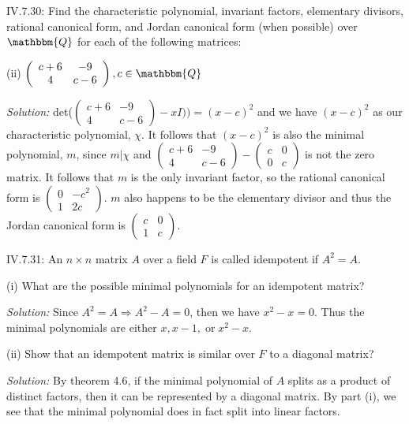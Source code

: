 \documentclass{letter}
\newcommand{\tmem}[1]{{\em #1\/}}
\newcommand{\tmop}[1]{\ensuremath{\operatorname{#1}}}
\begin{document}
IV.7.30: Find the characteristic polynomial, invariant factors, elementary
divisors, rational canonical form, and Jordan canonical form (when possible)
over $\mathbbm{Q}$ for each of the following matrices:

(ii) $\left(\begin{array}{cc}
  c + 6 & - 9\\
  4 & c - 6
\end{array}\right), c \in \mathbbm{Q}$

{\tmem{Solution:}} det($\left(\begin{array}{cc}
  c + 6 & - 9\\
  4 & c - 6
\end{array}\right) - x I)) = (x - c)^2$ and we have $(x - c)^2$ as our
characteristic polynomial, $\chi$. It follows that $(x - c)^2$ is also the
minimal polynomial, $m$, since $m| \chi$ and $\left(\begin{array}{cc}
  c + 6 & - 9\\
  4 & c - 6
\end{array}\right) - \left(\begin{array}{cc}
  c & 0\\
  0 & c
\end{array}\right)$ is not the zero matrix. It follows that $m$ is the only
invariant factor, so the rational canonical form is $\left(\begin{array}{cc}
  0 & - c^2\\
  1 & 2 c
\end{array}\right)$. $m$ also happens to be the elementary divisor and thus
the Jordan canonical form is $\left(\begin{array}{cc}
  c & 0\\
  1 & c
\end{array}\right)$.

IV.7.31: An $n \times n$ matrix $A$ over a field $F$ is called idempotent if
$A^2 = A$.

(i) What are the possible minimal polynomials for an idempotent matrix?

{\tmem{Solution:}} Since $A^2 = A \Rightarrow A^2 - A = 0$, then we have $x^2
- x = 0$. Thus the minimal polynomials are either $x, x - 1, \tmop{or} x^2 -
x$. \

(ii) Show that an idempotent matrix is similar over $F$ to a diagonal matrix?

{\tmem{Solution:}} By theorem 4.6, if the minimal polynomial of $A$ splits as
a product of distinct factors, then it can be represented by a diagonal
matrix. By part (i), we see that the minimal polynomial does in fact split
into linear factors.
\end{document}
